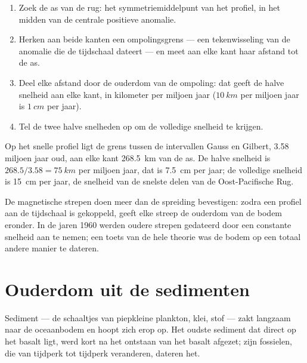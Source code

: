 \begin{method}\label{met:g11:drift-to-spreading:rate}
\begin{enumerate}
  \item Zoek de as van de rug: het symmetriemiddelpunt van het profiel, in het
        midden van de centrale positieve anomalie.
  \item Herken aan beide kanten een ompolingsgrens --- een tekenwisseling van de
        anomalie die de tijdschaal dateert --- en meet aan elke kant haar afstand
        tot de as.
  \item Deel elke afstand door de ouderdom van de ompoling: dat geeft de halve
        snelheid aan elke kant, in kilometer per miljoen jaar
        ($\qty{10}{km}$ per miljoen jaar is $\qty{1}{cm}$ per jaar).
  \item Tel de twee halve snelheden op om de volledige snelheid te krijgen.
\end{enumerate}
\end{method}

\begin{example}\label{ex:g11:drift-to-spreading:fast}
Op het snelle profiel ligt de grens tussen de intervallen Gauss en Gilbert,
\num{3.58} miljoen jaar oud, aan elke kant \qty{268.5}{km} van de as.
De halve snelheid is $268.5/3.58 = \qty{75}{km}$ per miljoen jaar, dat is
\qty{7.5}{cm} per jaar; de volledige snelheid is \qty{15}{cm} per jaar, de
snelheid van de snelste delen van de Oost-Pacifische Rug.
\end{example}

De magnetische strepen doen meer dan de spreiding bevestigen: zodra een profiel
aan de tijdschaal is gekoppeld, geeft elke streep de ouderdom van de bodem
eronder. In de jaren 1960 werden oudere strepen gedateerd door een constante
snelheid aan te nemen; een toets van de hele theorie was de bodem op een totaal
andere manier te dateren.

\section{Ouderdom uit de sedimenten}

Sediment --- de schaaltjes van piepkleine plankton, klei, stof --- zakt langzaam
naar de oceaanbodem en hoopt zich erop op. Het oudste sediment dat direct op het
basalt ligt, werd kort na het ontstaan van het basalt afgezet; zijn fossielen, die
van tijdperk tot tijdperk veranderen, dateren het.

